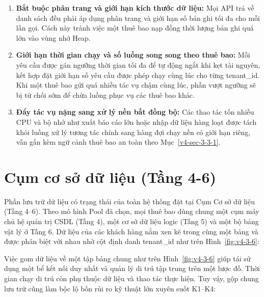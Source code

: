 \begin{enumerate}
\def\labelenumi{\arabic{enumi}.}
\item
  \textbf{Bắt buộc phân trang và giới hạn kích thước dữ liệu:} Mọi API trả về danh sách đều phải áp dụng phân trang và giới hạn số bản ghi tối đa cho mỗi lần gọi. Cách này tránh việc một thuê bao nạp đồng thời lượng bản ghi quá lớn vào vùng nhớ Heap.
\item
  \textbf{Giới hạn thời gian chạy và số luồng song song theo thuê bao:} Mỗi yêu cầu được gán ngưỡng thời gian tối đa để tự động ngắt khi kẹt tài nguyên, kết hợp đặt giới hạn số yêu cầu được phép chạy cùng lúc cho từng tenant\_\allowbreak{}id. Khi một thuê bao gửi quá nhiều tác vụ chậm cùng lúc, phần vượt ngưỡng sẽ bị từ chối sớm để chừa luồng phục vụ các thuê bao khác.
\item
  \textbf{Đẩy tác vụ nặng sang xử lý nền bất đồng bộ:} Các thao tác tốn nhiều CPU và bộ nhớ như xuất báo cáo lớn hoặc nhập dữ liệu hàng loạt được tách khỏi luồng xử lý tương tác chính sang hàng đợi chạy nền có giới hạn riêng, vẫn gắn kèm ngữ cảnh thuê bao an toàn theo Mục~\ref{v4-sec-3-3-1}.
\end{enumerate}

\section{Cụm cơ sở dữ liệu (Tầng 4-6)}\label{v4-sec-3-4}

Phần lưu trữ dữ liệu có trạng thái của toàn hệ thống đặt tại Cụm Cơ sở dữ liệu (Tầng 4--6). Theo mô hình Pool đã chọn, mọi thuê bao dùng chung một cụm máy chủ hệ quản trị CSDL (Tầng 4), một cơ sở dữ liệu logic (Tầng 5) và một bộ bảng vật lý ở Tầng 6. Dữ liệu của các khách hàng nằm xen kẽ trong cùng một bảng và được phân biệt với nhau nhờ cột định danh tenant\_\allowbreak{}id như trên Hình~\ref{fig:v4-3-6}:


Việc gom dữ liệu về một tập bảng chung như trên Hình~\ref{fig:v4-3-6} giúp tái sử dụng một bể kết nối duy nhất và quản lý di trú tập trung trên một lược đồ. Thời gian chạy di trú còn phụ thuộc dữ liệu và thao tác thực hiện. Tuy vậy, gộp chung lưu trữ cũng làm bộc lộ bốn rủi ro kỹ thuật lớn xuyên suốt K1--K4:

